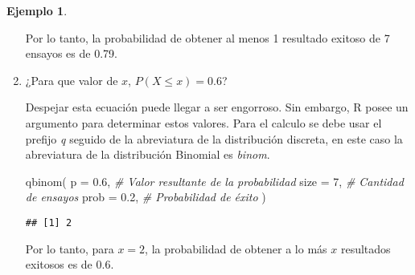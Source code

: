 \documentclass[
]{book}
\newenvironment{Shaded}{\begin{snugshade}}{\end{snugshade}}
\newcommand{\AttributeTok}[1]{\textcolor[rgb]{0.77,0.63,0.00}{#1}}
\newcommand{\CommentTok}[1]{\textcolor[rgb]{0.56,0.35,0.01}{\textit{#1}}}
\newcommand{\DecValTok}[1]{\textcolor[rgb]{0.00,0.00,0.81}{#1}}
\newcommand{\FloatTok}[1]{\textcolor[rgb]{0.00,0.00,0.81}{#1}}
\newcommand{\FunctionTok}[1]{\textcolor[rgb]{0.00,0.00,0.00}{#1}}
\newcommand{\NormalTok}[1]{#1}
\theoremstyle{definition}
\theoremstyle{definition}
\newtheorem{example}{Ejemplo}[chapter]
\theoremstyle{definition}
\theoremstyle{definition}
\theoremstyle{remark}
\begin{document}
\begin{example}
\begin{enumerate}
  Por lo tanto, la probabilidad de obtener al menos 1 resultado exitoso de 7 ensayos es de 0.79.
\item
  ¿Para que valor de \(x\), \(P(X \leq x) = 0.6\)?

  Despejar esta ecuación puede llegar a ser engorroso. Sin embargo, R posee un argumento para determinar estos valores. Para el calculo se debe usar el prefijo \emph{q} seguido de la abreviatura de la distribución discreta, en este caso la abreviatura de la distribución Binomial es \emph{binom}.

\begin{Shaded}
\begin{Highlighting}[]
\FunctionTok{qbinom}\NormalTok{(}
  \AttributeTok{p =} \FloatTok{0.6}\NormalTok{, }\CommentTok{\# Valor resultante de la probabilidad}
  \AttributeTok{size =} \DecValTok{7}\NormalTok{, }\CommentTok{\# Cantidad de ensayos}
  \AttributeTok{prob =} \FloatTok{0.2}\NormalTok{, }\CommentTok{\# Probabilidad de éxito}
\NormalTok{  )}
\end{Highlighting}
\end{Shaded}

\begin{verbatim}
## [1] 2
\end{verbatim}

  Por lo tanto, para \(x = 2\), la probabilidad de obtener a lo más \(x\) resultados exitosos es de 0.6.
\end{enumerate}

\end{example}
\end{document}

